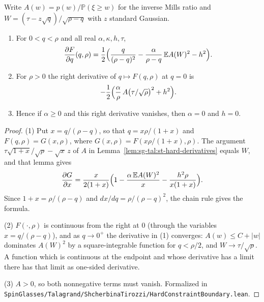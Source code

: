 \begin{lemma}[The overlap derivative, including the boundary $q=0$]\label{lem:sg-tal:st-hard-boundary}
  \leanok
Write $A(w)=p(w)/\mathbb P(\xi\ge w)$ for the inverse Mills ratio and $W=(\tau-z\sqrt q)/\sqrt{\rho-q}$ with $z$ standard
Gaussian.
\begin{enumerate}
\item For $0<q<\rho$ and all real $\alpha,\kappa,h,\tau$,
\[
\frac{\partial F}{\partial q}(q,\rho)=\frac12\Bigl(\frac q{(\rho-q)^2}-\frac{\alpha}{\rho-q}\,\mathbb EA(W)^2-h^2\Bigr).
\]
\item For $\rho>0$ the right derivative of $q\mapsto F(q,\rho)$ at $q=0$ is
\[
-\frac12\Bigl(\frac\alpha\rho\,A\bigl(\tau/\sqrt\rho\bigr)^2+h^2\Bigr).
\]
\item Hence if $\alpha\ge0$ and this right derivative vanishes, then $\alpha=0$ and $h=0$.
\end{enumerate}
\end{lemma}
\begin{proof}
  \leanok
(1) Put $x=q/(\rho-q)$, so that $q=x\rho/(1+x)$ and $F(q,\rho)=G(x,\rho)$, where $G(x,\rho)=F(x\rho/(1+x),\rho)$. The argument
$\tau\sqrt{1+x}/\sqrt\rho-\sqrt x\,z$ of $A$ in Lemma~\ref{lem:sg-tal:st-hard-derivatives} equals $W$, and that lemma gives
\[
\frac{\partial G}{\partial x}=\frac x{2(1+x)}\Bigl(1-\frac{\alpha\,\mathbb EA(W)^2}{x}-\frac{h^2\rho}{x(1+x)}\Bigr).
\]
Since $1+x=\rho/(\rho-q)$ and $dx/dq=\rho/(\rho-q)^2$, the chain rule gives the formula.

(2) $F(\cdot,\rho)$ is continuous from the right at $0$ (through the variables $x=q/(\rho-q)$), and as $q\to0^+$ the derivative in (1)
converges: $A(w)\le C+|w|$ dominates $A(W)^2$ by a square-integrable function for $q<\rho/2$, and $W\to\tau/\sqrt\rho$. A function
which is continuous at the endpoint and whose derivative has a limit there has that limit as one-sided derivative.

(3) $A>0$, so both nonnegative terms must vanish. Formalized in
\texttt{SpinGlasses/Talagrand/ShcherbinaTirozzi/HardConstraintBoundary.lean}.
\end{proof}

